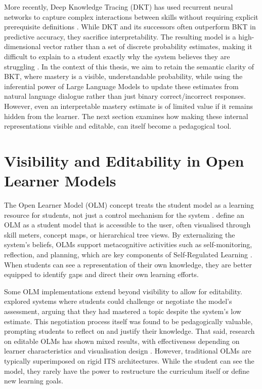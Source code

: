 \documentclass[logo,bsc,singlespacing,parskip,online]{infthesis}
\begin{document}
More recently, Deep Knowledge Tracing (DKT) has used recurrent neural networks to capture complex interactions between skills without requiring explicit prerequisite definitions \citep{piech2015dkt}. While DKT and its successors often outperform BKT in predictive accuracy, they sacrifice interpretability. The resulting model is a high-dimensional vector rather than a set of discrete probability estimates, making it difficult to explain to a student exactly why the system believes they are struggling \citep{khajah2016deep}. In the context of this thesis, we aim to retain the semantic clarity of BKT, where mastery is a visible, understandable probability, while using the inferential power of Large Language Models to update these estimates from natural language dialogue rather than just binary correct/incorrect responses. However, even an interpretable mastery estimate is of limited value if it remains hidden from the learner. The next section examines how making these internal representations visible and editable, can itself become a pedagogical tool.

\section{Visibility and Editability in Open Learner Models}

The Open Learner Model (OLM) concept treats the student model as a learning resource for students, not just a control mechanism for the system \citep{kay1997learner}. \citet{bull2010olm} define an OLM as a student model that is accessible to the user, often visualised through skill meters, concept maps, or hierarchical tree views. By externalizing the system's beliefs, OLMs support metacognitive activities such as self-monitoring, reflection, and planning, which are key components of Self-Regulated Learning \citep{zimmerman2002becoming}. When students can see a representation of their own knowledge, they are better equipped to identify gaps and direct their own learning efforts.

Some OLM implementations extend beyond visibility to allow for editability. \citet{bull2007invite} explored systems where students could challenge or negotiate the model's assessment, arguing that they had mastered a topic despite the system's low estimate. This negotiation process itself was found to be pedagogically valuable, prompting students to reflect on and justify their knowledge. That said, research on editable OLMs has shown mixed results, with effectiveness depending on learner characteristics and visualisation design \citep{hooshyar2020olm}. However, traditional OLMs are typically superimposed on rigid ITS architectures. While the student can see the model, they rarely have the power to restructure the curriculum itself or define new learning goals.
\end{document}
